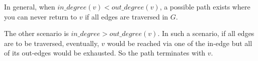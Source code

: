 \documentclass{article}
\begin{document}
In general, when $in\_degree(v) < out\_degree(v)$, a possible path exists where 
you can never return to $v$ if all edges are traversed in $G$. 

The other scenario is $in\_degree > out\_degree(v)$. In such a scenario, if all 
edges are to be traversed, eventually, $v$ would be reached via one of the 
in-edge but all of its out-edges would be exhausted. So the path terminates with
$v$. 



\newpage




\end{document}
